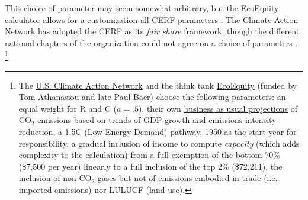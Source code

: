 This choice of parameter may seem somewhat arbitrary, but the \href{https://climateequityreference.org}{EcoEquity calculator} allows for a customization all CERF %
parameters \citep{holz_climate_2019}. The Climate Action Network has adopted the CERF %
as its \textit{fair share} framework, though the different national chapters of the organization could not agree on a choice of parameters \citep{athanasiou_fair_2022}.%
\footnote{The \href{https://usfairshare.org/}{U.S. Climate Action Network} and the think tank \href{https://www.ecoequity.org/about/}{EcoEquity} (funded by Tom Athanasiou and late Paul Baer) choose the following parameters: an equal weight for R and C ($a=.5$), their own \href{https://climateequityreference.org/calculator-information/gdp-and-emissions-baselines/}{business as usual projections} of CO$_\text{2}$ emissions based on trends of GDP growth and emissions intensity reduction,  %
a 1.5\textdegree{}C (Low Energy Demand) pathway, 1950 as the start year for responsibility, a gradual inclusion of income to compute \textit{capacity} (which adds complexity to the calculation) from a full exemption of the bottom 70\% (\$7,500 per year) linearly to a full inclusion of the top 2\% (\$72,211), the inclusion of non-CO$_\text{2}$ gases but not of emissions embodied in trade (i.e. imported emissions) nor LULUCF (land-use). }

